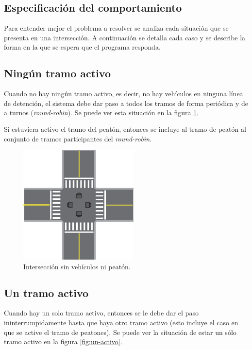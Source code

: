	\subsection{Especificación del comportamiento}\label{sec:spec}

		Para entender mejor el problema a resolver se analiza cada situación que se presenta en una intersección.
		A continuación se detalla cada caso y se describe la forma en la que se espera que el programa responda.



	\subsection{Ningún tramo activo}

		Cuando no hay ningún tramo activo, es decir, no hay vehículos en ninguna línea de detención, el sistema debe dar paso a todos los tramos de forma periódica y de a turnos (\emph{round-robin}).
		Se puede ver esta situación en la figura \ref{fig:ningun-activo}.

		Si estuviera activo el tramo del peatón, entonces se incluye al tramo de peatón al conjunto de tramos participantes del \emph{round-robin}.

		\begin{figure}[htbp]
			\centering
			\includegraphics[width=6cm]{imagenes/ningun-activo.eps}
			\caption{Intersección sin vehículos ni peatón.}
			\label{fig:ningun-activo}
		\end{figure}



	\subsection{Un tramo activo}

		Cuando hay un solo tramo activo, entonces se le debe dar el paso ininterrumpidamente hasta que haya otro tramo activo (esto incluye el caso en que se active el tramo de peatones).
		Se puede ver la situación de estar un sólo tramo activo en la figura \ref{fig:un-activo}.

